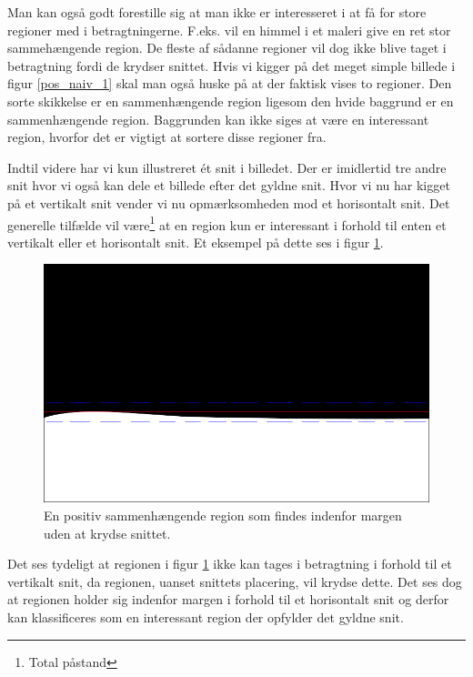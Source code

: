 {Man kan også godt forestille sig at man ikke er interesseret i at få for
store regioner med i betragtningerne. F.eks. vil en himmel i et maleri
give en ret stor sammehængende region. De fleste af sådanne regioner vil
dog ikke blive taget i betragtning fordi de krydser snittet. Hvis vi
kigger på det meget simple billede i figur \ref{pos_naiv_1} skal man
også huske på at der faktisk vises to regioner. Den sorte skikkelse er
en sammenhængende region ligesom den hvide baggrund er en sammenhængende
region. Baggrunden kan ikke siges at være en interessant region, hvorfor
det er vigtigt at sortere disse regioner fra.

Indtil videre har vi kun illustreret ét snit i billedet. Der er
imidlertid tre andre snit hvor vi også kan dele et billede efter det
gyldne snit. Hvor vi nu har kigget på et vertikalt snit vender vi nu
opmærksomheden mod et horisontalt snit. Det generelle tilfælde vil
være\footnote{Total påstand} at en region kun er interessant i forhold
til enten et vertikalt eller et horisontalt snit. Et eksempel på dette
ses i figur \ref{pos_horiz_naiv_margin_1}.
\begin{figure}[H]
	\begin{center}
		\includegraphics[scale=\imgscale,angle=0]{afsnit/vores_implementation/billeder/naiv_algoritme/naiv_horiz_positiv_blob_1}
	\end{center}
	\caption[Positiv horisontal region]{En positiv sammenhængende region som findes indenfor
	margen uden at krydse snittet.}
	\label{pos_horiz_naiv_margin_1}
\end{figure}
Det ses tydeligt at regionen i figur \ref{pos_horiz_naiv_margin_1} ikke
kan tages i betragtning i forhold til et vertikalt snit, da regionen,
uanset snittets placering, vil krydse dette. Det ses dog at regionen
holder sig indenfor margen i forhold til et horisontalt snit og derfor
kan klassificeres som en interessant region der opfylder det gyldne
snit.

}

